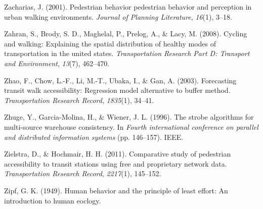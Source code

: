 \documentclass[
11pt, %
oneside, %
english, %
singlespacing, %
]{macthesis} %
\newlength{\cslhangindent}
\newenvironment{CSLReferences}[2] %
 {%
  \setlength{\parindent}{0pt}
  \ifodd #1 \everypar{\setlength{\hangindent}{\cslhangindent}}\ignorespaces\fi
  \ifnum #2 > 0
  \setlength{\parskip}{#2\baselineskip}
  \fi
 }%
 {}
\begin{document}
\begin{CSLReferences}{1}{0}
\leavevmode{}%
Zacharias, J. (2001). Pedestrian behavior pedestrian behavior and perception in urban walking environments. \emph{Journal of Planning Literature}, \emph{16}(1), 3--18.

\leavevmode{}%
Zahran, S., Brody, S. D., Maghelal, P., Prelog, A., \& Lacy, M. (2008). Cycling and walking: Explaining the spatial distribution of healthy modes of transportation in the united states. \emph{Transportation Research Part D: Transport and Environment}, \emph{13}(7), 462--470.

\leavevmode{}%
Zhao, F., Chow, L.-F., Li, M.-T., Ubaka, I., \& Gan, A. (2003). Forecasting transit walk accessibility: Regression model alternative to buffer method. \emph{Transportation Research Record}, \emph{1835}(1), 34--41.

\leavevmode{}%
Zhuge, Y., Garcia-Molina, H., \& Wiener, J. L. (1996). The strobe algorithms for multi-source warehouse consistency. In \emph{Fourth international conference on parallel and distributed information systems} (pp. 146--157). IEEE.

\leavevmode{}%
Zielstra, D., \& Hochmair, H. H. (2011). Comparative study of pedestrian accessibility to transit stations using free and proprietary network data. \emph{Transportation Research Record}, \emph{2217}(1), 145--152.

\leavevmode{}%
Zipf, G. K. (1949). Human behavior and the principle of least effort: An introduction to human eoclogy.

\end{CSLReferences}
\end{document}
